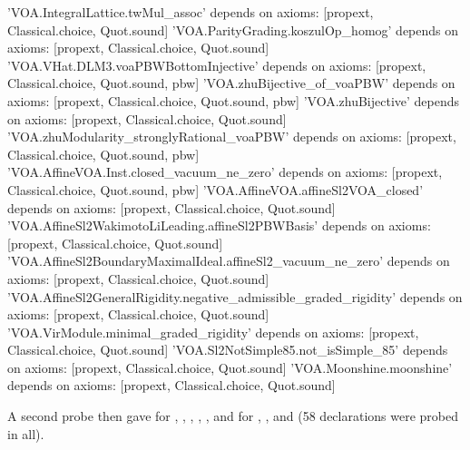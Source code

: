 \begin{plaincode}
'VOA.IntegralLattice.twMul_assoc' depends on axioms: [propext, Classical.choice, Quot.sound]
'VOA.ParityGrading.koszulOp_homog' depends on axioms: [propext, Classical.choice, Quot.sound]
'VOA.VHat.DLM3.voaPBWBottomInjective' depends on axioms: [propext, Classical.choice, Quot.sound, pbw]
'VOA.zhuBijective_of_voaPBW' depends on axioms: [propext, Classical.choice, Quot.sound, pbw]
'VOA.zhuBijective' depends on axioms: [propext, Classical.choice, Quot.sound]
'VOA.zhuModularity_stronglyRational_voaPBW' depends on axioms: [propext, Classical.choice, Quot.sound, pbw]
'VOA.AffineVOA.Inst.closed_vacuum_ne_zero' depends on axioms: [propext, Classical.choice, Quot.sound, pbw]
'VOA.AffineVOA.affineSl2VOA_closed' depends on axioms: [propext, Classical.choice, Quot.sound]
'VOA.AffineSl2WakimotoLiLeading.affineSl2PBWBasis' depends on axioms: [propext, Classical.choice, Quot.sound]
'VOA.AffineSl2BoundaryMaximalIdeal.affineSl2_vacuum_ne_zero' depends on axioms: [propext, Classical.choice, Quot.sound]
'VOA.AffineSl2GeneralRigidity.negative_admissible_graded_rigidity' depends on axioms: [propext, Classical.choice, Quot.sound]
'VOA.VirModule.minimal_graded_rigidity' depends on axioms: [propext, Classical.choice, Quot.sound]
'VOA.Sl2NotSimple85.not_isSimple_85' depends on axioms: [propext, Classical.choice, Quot.sound]
'VOA.Moonshine.moonshine' depends on axioms: [propext, Classical.choice, Quot.sound]
\end{plaincode}
A second probe then gave  for
\allowbreak{}\allowbreak{}\allowbreak{}\allowbreak{}\allowbreak{}, \allowbreak{}\allowbreak{}\allowbreak{}\allowbreak{},
\allowbreak{}\allowbreak{}, \allowbreak{}\allowbreak{}\allowbreak{}\allowbreak{},
\allowbreak{}\allowbreak{}\allowbreak{}\allowbreak{}, and  for
\allowbreak{}\allowbreak{}\allowbreak{}\allowbreak{}, \allowbreak{}\allowbreak{}\allowbreak{}\allowbreak{}\allowbreak{},
\allowbreak{}\allowbreak{}\allowbreak{}\allowbreak{} and
\allowbreak{}\allowbreak{}\allowbreak{}\allowbreak{}\allowbreak{} (58 declarations were probed in all).

